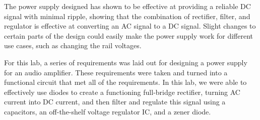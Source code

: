 \documentclass[12pt]{article}
\begin{document}
The power supply designed has shown to be effective at providing a reliable DC signal with minimal ripple, showing that the combination of rectifier, filter, and regulator is effective 
at converting an AC signal to a DC signal. Slight changes to certain parts of the design could easily make the power supply work for different use cases, such as changing the rail voltages.

For this lab, a series of requirements was laid out for designing a power supply for an audio
amplifier. These requirements were taken and turned into a functional circuit that met
all of the requirements. In this lab, we were able to effectively use diodes to create
a functioning full-bridge rectifier, turning AC current into DC current, and then filter
and regulate this signal using a capacitors, an off-the-shelf voltage regulator IC, and
a zener diode.

\newpage
\end{document}
